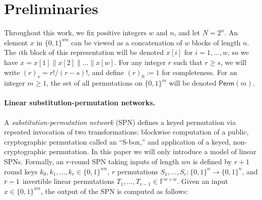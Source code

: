 

\section{Preliminaries}
\label{sec:preliminary}

Throughout this work, we fix positive integers $w$ and $n$, and let $N=2^n$. An element $x$ in $\{0,1\}^{wn}$ can be viewed as a concatenation of $w$ blocks of length $n$. The $i$th block of this representation will be denoted $x[i]$ for $i=1,\ldots,w$, so we have $x=x[1]\|x[2]\|\ldots\|x[w]$. For any integer $r$ such that $r\geq s$, we will write $(r)_s = r!/(r-s)!$, and define $(r)_0:=1$ for completeness. For an integer $m\geq1$, the set of all permutations on $\{0, 1\}^m$ will be denoted $\textsf{Perm}(m)$.




%


\paragraph{Linear substitution-permutation networks.}

A \emph{substitution-permutation network} (SPN) defines a keyed permutation via repeated invocation of two transformations: blockwise computation of a public, cryptographic permutation called an ``S-box,'' and application of a keyed, non-cryptographic permutation. In this paper we will only introduce a model of linear SPNs.
%
%
Formally, an $r$-round SPN taking inputs of length $w n$ is defined by $r+1$ round keys $k_0,k_1,\ldots,k_r\in\{0,1\}^{wn}$, $r$ permutations $S_1,\ldots,S_r:\{0,1\}^{n} \rightarrow \{0,1\}^{n}$, and $\mathnormal{r}-1$ invertible linear permutations $T_1,\ldots,T_{r-1}\in\mathbb{F}^{w\times w}$. Given an input $x \in \{0,1\}^{w n}$, the output of the SPN is computed as follows:

